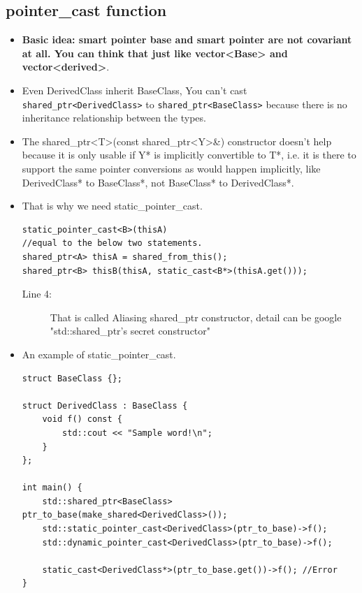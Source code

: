 \documentclass[a4paper,11pt,twoside]{book}
\begin{document}
\subsection{pointer\_cast function}
\begin{itemize}
	\item \textbf{Basic idea: smart pointer base and smart pointer are not covariant at all. You can think that just like vector<Base> and vector<derived>}.
			
	\item Even DerivedClass inherit BaseClass,  You can't cast \texttt{shared\_ptr<DerivedClass>} to \texttt{shared\_ptr<BaseClass>} because there is no inheritance relationship between the types. 
	
	\item The shared\_ptr<T>(const shared\_ptr<Y>\&) constructor doesn't help because it is only usable if Y* is implicitly convertible to T*, i.e. it is there to support the same pointer conversions as would happen implicitly, like DerivedClass* to BaseClass*, not BaseClass* to DerivedClass*.
	
	\item That is why we need static\_pointer\_cast.
\begin{lstlisting}
static_pointer_cast<B>(thisA)
//equal to the below two statements.
shared_ptr<A> thisA = shared_from_this();
shared_ptr<B> thisB(thisA, static_cast<B*>(thisA.get()));
\end{lstlisting}
\begin{description}
	\item[Line 4:] That is called Aliasing shared\_ptr constructor, detail can be google "std::shared\_ptr's secret constructor"
	
\end{description}

	\item An example of static\_pointer\_cast.
\begin{lstlisting}
struct BaseClass {};

struct DerivedClass : BaseClass {
	void f() const {
		std::cout << "Sample word!\n";
	}
};

int main() {
	std::shared_ptr<BaseClass> ptr_to_base(make_shared<DerivedClass>());
	std::static_pointer_cast<DerivedClass>(ptr_to_base)->f();
	std::dynamic_pointer_cast<DerivedClass>(ptr_to_base)->f();

	static_cast<DerivedClass*>(ptr_to_base.get())->f(); //Error
}
\end{lstlisting}

\end{itemize}
\end{document}
